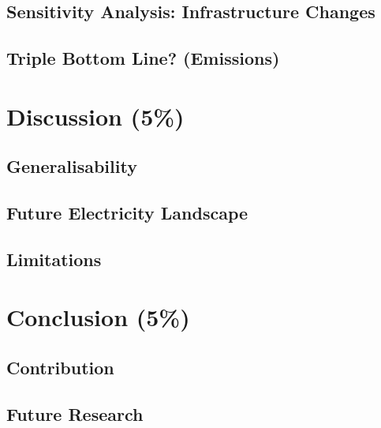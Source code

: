 \documentclass[12pt, article]{article}
\begin{document}
\subsection{Sensitivity Analysis: Infrastructure Changes}
\label{sec:org1376e34}
\subsection{Triple Bottom Line? (Emissions)}
\label{sec:orgfce7092}

\section{Discussion (5\%)}
\label{sec:orga280bff}
\subsection{Generalisability}
\label{sec:org5090d94}
\subsection{Future Electricity Landscape}
\label{sec:org451132e}
\subsection{Limitations}
\label{sec:orgf2925d7}
\section{Conclusion (5\%)}
\label{sec:org24f5bf9}
\subsection{Contribution}
\label{sec:org5e61fd4}
\subsection{Future Research}
\label{sec:org6642b51}



\clearpage
\printbibliography
\end{document}
